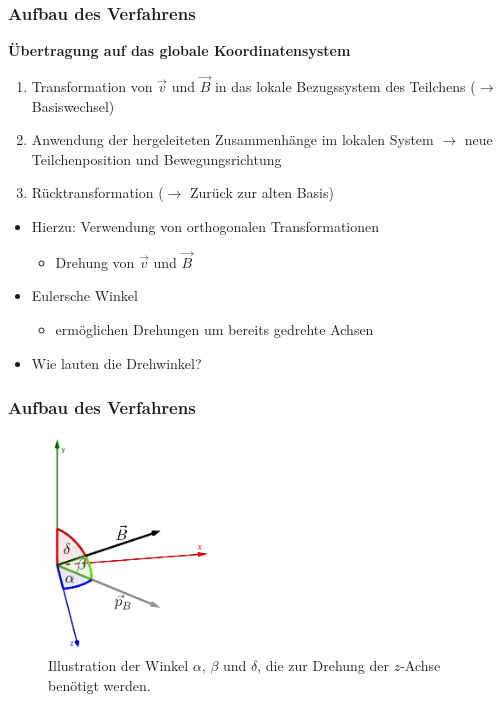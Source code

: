\begin{frame}
  \frametitle{Aufbau des Verfahrens}
  \onslide<+->
  \textbf{\"Ubertragung auf das globale Koordinatensystem}
  \begin{enumerate}
    \item<+-> Transformation von \(\vec{v}\) und \(\vec{B}\) in das lokale Bezugssystem des Teilchens (\(\rightarrow\) Basiswechsel)
    \item<+-> Anwendung der hergeleiteten Zusammenh\"ange im lokalen System \(\rightarrow\) neue Teilchenposition und Bewegungsrichtung
    \item<+-> R\"ucktransformation (\(\rightarrow\) Zur\"uck zur alten Basis)
  \end{enumerate}
  \begin{itemize}
    \item<+-> Hierzu: Verwendung von orthogonalen Transformationen
      \begin{itemize}
        \item<+-> Drehung von \(\vec{v}\) und \(\vec{B}\)
      \end{itemize}
    \item<+-> Eulersche Winkel
      \begin{itemize}
        \item<+-> erm\"oglichen Drehungen um bereits gedrehte Achsen
      \end{itemize}
    \item<+-> Wie lauten die Drehwinkel?
  \end{itemize}
\end{frame}

\begin{frame}
  \frametitle{Aufbau des Verfahrens}
  \begin{figure}
    \centering
    \includegraphics[width=0.4\textwidth]{../geogebra/img/winkel_edited}
    \caption{Illustration der Winkel \(\alpha\), \(\beta\) und \(\delta\), die zur Drehung der \(z\)-Achse ben\"otigt werden.}
    \label{fig:winkelfig}
  \end{figure}
\end{frame}

